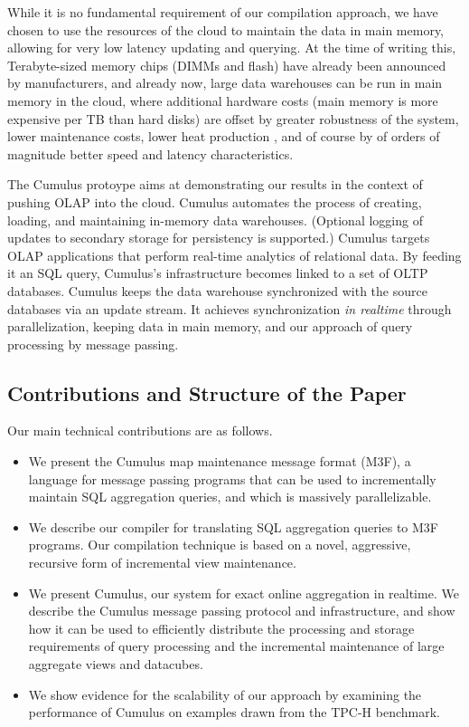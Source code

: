 While it is no fundamental requirement of our compilation
approach, we have chosen to use the resources of the cloud to maintain
the data in main memory, allowing for very low latency updating and querying.
At the time of writing this,
Terabyte-sized memory chips (DIMMs and flash) have already been announced by
manufacturers, and already now, large data warehouses
can be run in main memory in the cloud, where additional hardware costs
(main memory is more expensive per TB than hard disks) are
offset by greater robustness of the system, lower maintenance
costs, lower heat production \cite{1154557}, and of course by of orders
of magnitude better speed and latency characteristics.

The Cumulus protoype aims at demonstrating our results in the context of
pushing OLAP into the cloud.
Cumulus automates  the process of  creating, loading,
and  maintaining  in-memory  data  warehouses.
(Optional logging of updates to secondary storage
for persistency is supported.)
Cumulus targets OLAP applications  that perform real-time analytics of
relational data.  By feeding it an SQL query, Cumulus's infrastructure
becomes linked to  a set of OLTP databases.  Cumulus  keeps the
data warehouse synchronized with the source databases via an
update stream. It achieves synchronization {\em in realtime}
through parallelization, keeping data in main memory, and our approach of
query processing by message passing.


\subsection{Contributions and Structure of the Paper}


Our main technical contributions are as follows.
\begin{itemize}
\item
We present the Cumulus map maintenance message format (M3F), a language
for message passing programs that can be used to incrementally maintain
SQL aggregation queries, and which is massively parallelizable.

\item
We describe our compiler for translating SQL aggregation queries to M3F
programs. Our compilation technique is based on a novel, aggressive, recursive
form of incremental view maintenance.

\item
We present Cumulus, our system for exact online aggregation in realtime.
We describe the Cumulus message passing protocol and
infrastructure, and show how it can be used to efficiently distribute the
processing and storage requirements of query processing and
the incremental maintenance of large aggregate views and datacubes.

\item We show evidence for the scalability of our approach by examining the
performance of Cumulus on examples drawn from the TPC-H\cite{tpch2008}
benchmark. 
\end{itemize}



